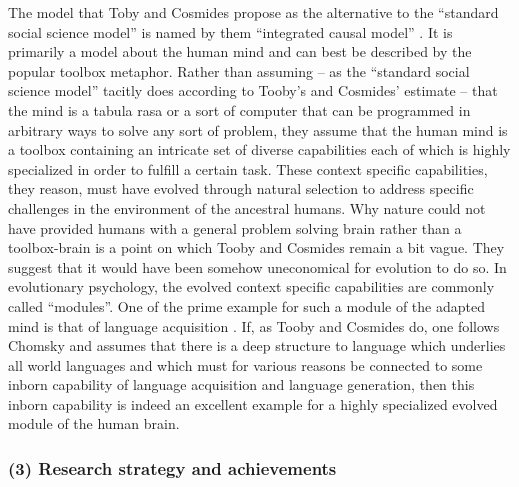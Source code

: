 The model that Toby and Cosmides propose as the alternative to the ``standard
social science model'' is named by them ``integrated causal model'' \cite[p.\ 
23/24]{tooby-cosmides:1992}. It is primarily a model about the human mind and
can best be described by the popular toolbox metaphor. Rather than assuming --
as the ``standard social science model'' tacitly does according to Tooby's and
Cosmides' estimate -- that the mind is a tabula rasa or a sort of computer
that can be programmed in arbitrary ways to solve any sort of problem, they
assume that the human mind is a toolbox containing an intricate set of diverse
capabilities each of which is highly specialized in order to fulfill a certain
task. These context specific capabilities, they reason, must have evolved
through natural selection to address specific challenges in the environment of
the ancestral humans.  Why nature could not have provided humans with a
general problem solving brain rather than a toolbox-brain is a point on which
Tooby and Cosmides remain a bit vague. They suggest that it would have been
somehow uneconomical for evolution to do so. In evolutionary psychology, the
evolved context specific capabilities are commonly called ``modules''. One of
the prime example for such a module of the adapted mind is that of language
acquisition \cite[p.\ 70]{tooby-cosmides:1992}.  If, as Tooby and Cosmides do,
one follows Chomsky and assumes that there is a deep structure to language
which underlies all world languages and which must for various reasons be
connected to some inborn capability of language acquisition and language
generation, then this inborn capability is indeed an excellent example for a
highly specialized evolved module of the human brain.

\subsubsection{(3) Research strategy and achievements} 

